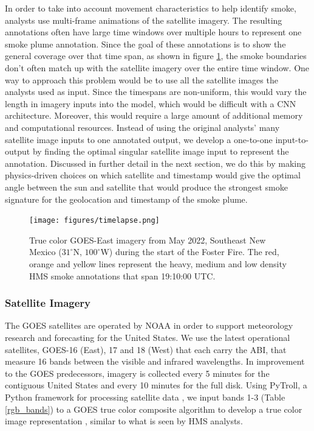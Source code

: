 \documentclass{article}
\begin{document}
In order to take into account movement characteristics to help identify smoke, analysts use multi-frame animations of the satellite imagery. The resulting annotations often have large time windows over multiple hours to represent one smoke plume annotation. Since the goal of these annotations is to show the general coverage over that time span, as shown in figure \ref{timelapse}, the smoke boundaries don't often match up with the satellite imagery over the entire time window. One way to approach this problem would be to use all the satellite images the analysts used as input. Since the timespans are non-uniform, this would vary the length in imagery inputs into the model, which would be difficult with a CNN architecture. Moreover, this would require a large amount of additional memory and computational resources. Instead of using the original analysts' many satellite image inputs to one annotated output, we develop a one-to-one input-to-output by finding the optimal singular satellite image input to represent the annotation. Discussed in further detail in the next section, we do this by making physics-driven choices on which satellite and timestamp would give the optimal angle between the sun and satellite that would produce the strongest smoke signature for the geolocation and timestamp of the smoke plume.


\begin{figure} \label{timelapse}
    \centering
    \texttt{[image: figures/timelapse.png]}
    \caption{True color GOES-East imagery from May 2022, Southeast New Mexico (\(31^{\circ}\)N, \(100^{\circ}\)W) during the start of the Foster Fire. The red, orange and yellow lines represent the heavy, medium and low density HMS smoke annotations that span 19:10:00 UTC.}
\end{figure}


\subsubsection*{Satellite Imagery} 

The GOES satellites are operated by NOAA in order to support meteorology research and forecasting for the United States. We use the latest operational satellites, GOES-16 (East), 17 and 18 (West) that each carry the ABI, that measure 16 bands between the visible and infrared wavelengths. In improvement to the GOES predecessors, imagery is collected every 5 minutes for the contiguous United States and every 10 minutes for the full disk. Using PyTroll, a Python framework for processing satellite data \cite{satpy}, we input bands 1-3 (Table \ref{rgb_bands}) to a GOES true color composite algorithm to develop a true color image representation \cite{true_color}, similar to what is seen by HMS analysts.
\end{document}
